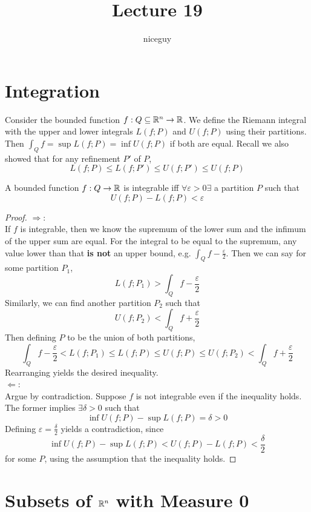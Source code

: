 \documentclass[12pt]{article}
\title{Lecture 19}
\author{niceguy}
\begin{document}
\maketitle

\section{Integration}

Consider the bounded function $f:Q \subseteq \mathbb{R}^n \rightarrow \mathbb{R}$. We define the Riemann integral with the upper and lower integrals $L(f;P)$ and $U(f;P)$ using their partitions. Then $\int_Q f = \sup L(f;P) = \inf U(f;P)$ if both are equal. Recall we also showed that for any refinement $P'$ of $P$,
$$L(f;P) \leq L(f;P') \leq U(f;P') \leq U(f;P)$$

\begin{prop}
    A bounded function $f:Q\rightarrow\mathbb{R}$ is integrable iff $\forall \varepsilon > 0 \exists$ a partition $P$ such that
    $$U(f;P) - L(f;P) < \varepsilon$$
\end{prop}

\begin{proof}
    $\Rightarrow$: \\
    If $f$ is integrable, then we know the supremum of the lower sum and the infimum of the upper sum are equal. For the integral to be equal to the supremum, any value lower than that \textbf{is not} an upper bound, e.g. $\int_Q f - \frac{\varepsilon}{2}$. Then we can say for some partition $P_1$,
    $$L(f;P_1) > \int_Q f - \frac{\varepsilon}{2}$$
    Similarly, we can find another partition $P_2$ such that
    $$U(f;P_2) < \int_Q f + \frac{\varepsilon}{2}$$
    Then defining $P$ to be the union of both partitions,
    $$\int_Q f - \frac{\varepsilon}{2} < L(f;P_1) \leq L(f;P) \leq U(f;P) \leq U(f;P_2) < \int_Q f + \frac{\varepsilon}{2}$$
    Rearranging yields the desired inequality. \\
    $\Leftarrow$: \\
    Argue by contradiction. Suppose $f$ is not integrable even if the inequality holds. The former implies $\exists \delta > 0$ such that
    $$\inf U(f;P) - \sup L(f;P) = \delta > 0$$
    Defining $\varepsilon = \frac{\delta}{2}$ yields a contradiction, since
    $$\inf U(f;P) - \sup L(f;P) < U(f;P) - L(f;P) < \frac{\delta}{2}$$
    for some $P$, using the assumption that the inequality holds.
\end{proof}

\section{Subsets of $\mathbb{R}^n$ with Measure 0}
\end{document}
